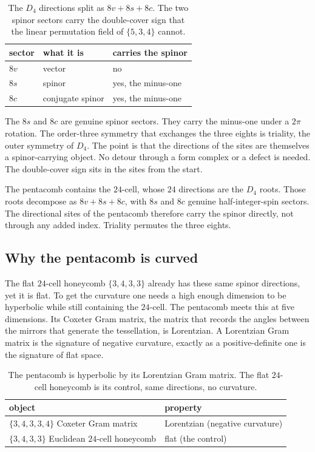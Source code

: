 \begin{table}[ht]
\centering
\begin{tabular}{@{}lll@{}}
\toprule
sector & what it is & carries the spinor \\
\midrule
$8v$ & vector & no \\
$8s$ & spinor & yes, the minus-one \\
$8c$ & conjugate spinor & yes, the minus-one \\
\bottomrule
\end{tabular}
\caption{The $D_4$ directions split as $8v + 8s + 8c$. The two spinor sectors carry
the double-cover sign that the linear permutation field of $\{5,3,4\}$ cannot.}
\label{tab:pentacomb-triality}
\end{table}

The $8s$ and $8c$ are genuine spinor sectors. They carry the minus-one under a $2\pi$
rotation. The order-three symmetry that exchanges the three eights is triality, the
outer symmetry of $D_4$. The point is that the directions of the sites are themselves
a spinor-carrying object. No detour through a form complex or a defect is needed. The
double-cover sign sits in the sites from the start.

\begin{proposition}
The pentacomb contains the $24$-cell, whose $24$ directions are the $D_4$ roots.
Those roots decompose as $8v + 8s + 8c$, with $8s$ and $8c$ genuine half-integer-spin
sectors. The directional sites of the pentacomb therefore carry the spinor directly,
not through any added index. Triality permutes the three eights.
\end{proposition}

\subsection{Why the pentacomb is curved}

The flat $24$-cell honeycomb $\{3,4,3,3\}$ already has these same spinor directions,
yet it is flat. To get the curvature one needs a high enough dimension to be
hyperbolic while still containing the $24$-cell. The pentacomb meets this at five
dimensions. Its Coxeter Gram matrix, the matrix that records the angles between the
mirrors that generate the tessellation, is Lorentzian. A Lorentzian Gram matrix is
the signature of negative curvature, exactly as a positive-definite one is the
signature of flat space.

\begin{table}[ht]
\centering
\begin{tabular}{@{}ll@{}}
\toprule
object & property \\
\midrule
$\{3,4,3,3,4\}$ Coxeter Gram matrix & Lorentzian (negative curvature) \\
$\{3,4,3,3\}$ Euclidean $24$-cell honeycomb & flat (the control) \\
\bottomrule
\end{tabular}
\caption{The pentacomb is hyperbolic by its Lorentzian Gram matrix. The flat
$24$-cell honeycomb is its control, same directions, no curvature.}
\label{tab:pentacomb-curvature}
\end{table}

